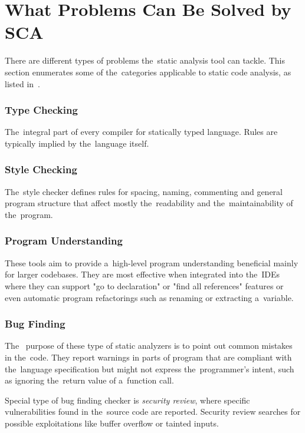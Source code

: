 \documentclass[
  digital, %
  table,   %
  lof,     %
  lot,     %
  oneside,
]{fithesis3}
\begin{document}
\section{What Problems Can Be Solved by SCA}
There are different types of problems the~static analysis tool can tackle. This section enumerates some of the~categories applicable to static code analysis, as listed in~\cite{secure-programming-with-sca}.

\subsubsection{\textbf{Type Checking}}
The~integral part of every compiler for statically typed language. Rules are typically implied by the~language itself.

\subsubsection{\textbf{Style Checking}}
The~style checker defines rules for spacing, naming, commenting and general program structure that affect mostly the~readability and the~maintainability of the~program. 

\subsubsection{\textbf{Program Understanding}}
These tools aim to provide a~high-level program understanding beneficial mainly for larger codebases. They are most effective when integrated into the~IDEs where they can support "go to declaration" or "find all references" features or even automatic program refactorings such as renaming or extracting a~variable.

\subsubsection{\textbf{Bug Finding}}
The~ purpose of these type of static analyzers is to point out common mistakes in the~code. They report warnings in parts of program that are compliant with the~language specification but might not express the~programmer's intent, such as ignoring the~return value of a~function call.

Special type of bug finding checker is \textit{security review}, where specific vulnerabilities found in the~source code are reported. Security review searches for possible exploitations like buffer overflow or tainted inputs.
  
\end{document}
